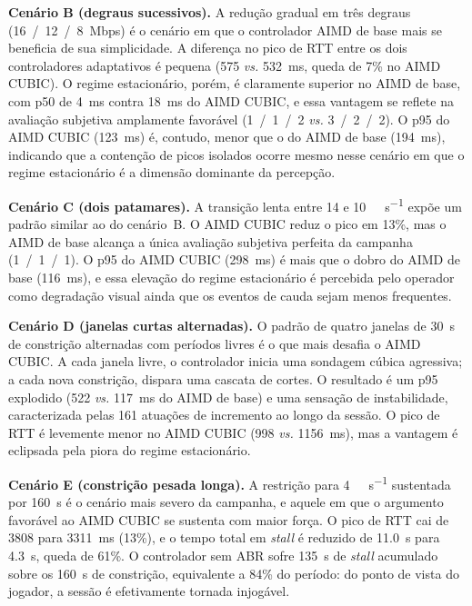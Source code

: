 \textbf{Cenário B (degraus sucessivos).} A redução gradual em
três degraus (16~/~12~/~8~Mbps) é o cenário em que o
controlador AIMD de base mais se beneficia de sua simplicidade.
A diferença no pico de RTT entre os dois controladores
adaptativos é pequena (575 \emph{vs.} 532~ms, queda de 7\% no
AIMD CUBIC). O regime estacionário, porém, é claramente
superior no AIMD de base, com p50 de 4~ms contra 18~ms do AIMD
CUBIC, e essa vantagem se reflete na avaliação subjetiva
amplamente favorável (1~/~1~/~2 \emph{vs.} 3~/~2~/~2). O p95
do AIMD CUBIC (123~ms) é, contudo, menor que o do AIMD de base
(194~ms), indicando que a contenção de picos isolados ocorre
mesmo nesse cenário em que o regime estacionário é a dimensão
dominante da percepção.

\textbf{Cenário C (dois patamares).} A transição lenta entre
14 e \SI{10}{\mega\bit\per\second} expõe um padrão similar ao
do cenário~B. O AIMD CUBIC reduz o pico em 13\%, mas o AIMD
de base alcança a única avaliação subjetiva perfeita da
campanha (1~/~1~/~1). O p95 do AIMD CUBIC (298~ms) é mais que
o dobro do AIMD de base (116~ms), e essa elevação do regime
estacionário é percebida pelo operador como degradação visual
ainda que os eventos de cauda sejam menos frequentes.

\textbf{Cenário D (janelas curtas alternadas).} O padrão de
quatro janelas de \SI{30}{\second} de constrição alternadas
com períodos livres é o que mais desafia o AIMD CUBIC. A cada
janela livre, o controlador inicia uma sondagem cúbica
agressiva; a cada nova constrição, dispara uma cascata de
cortes. O resultado é um p95 explodido (522 \emph{vs.} 117~ms
do AIMD de base) e uma sensação de instabilidade,
caracterizada pelas 161 atuações de incremento ao longo da
sessão. O pico de RTT é levemente menor no AIMD CUBIC (998
\emph{vs.} 1156~ms), mas a vantagem é eclipsada pela piora
do regime estacionário.

\textbf{Cenário E (constrição pesada longa).} A restrição
para \SI{4}{\mega\bit\per\second} sustentada por
\SI{160}{\second} é o cenário mais severo da campanha, e
aquele em que o argumento favorável ao AIMD CUBIC se
sustenta com maior força. O pico de RTT cai de 3808 para
3311~ms (13\%), e o tempo total em \emph{stall} é reduzido de
\SI{11.0}{\second} para \SI{4.3}{\second}, queda de 61\%. O
controlador sem ABR sofre \SI{135}{\second} de \emph{stall}
acumulado sobre os \SI{160}{\second} de constrição, equivalente
a 84\% do período: do ponto de vista do jogador, a sessão é
efetivamente tornada injogável.

